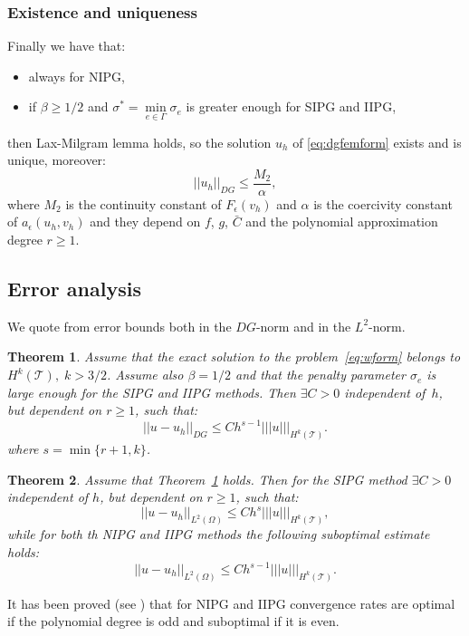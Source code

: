 \documentclass[12pt, a4paper]{article}
\theoremstyle{definition}
\theoremstyle{plain}
\theoremstyle{plain}
\newtheorem{teor}{Theorem}
\theoremstyle{definition}
\begin{document}
\subsubsection{Existence and uniqueness}
Finally we have that:
\begin{itemize}
	\item always for NIPG,
	\item if $\beta \geq 1/2$ and $\sigma^* = \min\limits_{e \in \Gamma} 
	\sigma_e$ is greater enough for SIPG and IIPG,
\end{itemize}
then Lax-Milgram lemma holds, so the solution $u_h$ of \eqref{eq:dgfemform} 
exists and is unique, moreover:\\
\begin{equation*}
	|\!|u_h|\!|_{DG} \leq \frac{M_2}{\alpha},
\end{equation*}
where $M_2$ is the continuity constant of $F_\epsilon(v_h)$ and $\alpha$ is the 
coercivity constant of $a_\epsilon(u_h,v_h)$ and they depend on $f$, $g$, 
$\bar{C}$ and the polynomial approximation degree $r \geq 1$.
\subsection{Error analysis}
We quote from \cite{riviere} error bounds both in the $DG$-norm and in the $L^2$-norm.
\begin{teor} \label{teo:errdg}
	Assume that the exact solution to the problem~\eqref{eq:wform} belongs to 
	$H^k(\mathcal{T}), \; k>3/2$. Assume also $\beta = 1/2$ and that the 
	penalty parameter $\sigma_e$ is large enough for the SIPG and IIPG methods. 
	Then $\exists C>0$ independent of~$h$, but dependent on $r \geq 1$, such 
	that:
	\begin{equation*}
		|\!| u -u_h |\!|_{DG} \leq C h^{s-1} |\!|\!|u|\!|\!|_{H^k(\mathcal{T})}.
	\end{equation*}
	where $s = \min \{r+1, k\}$.
\end{teor}
\begin{teor}
	Assume that Theorem~\ref{teo:errdg} holds. Then for the SIPG method 
	$\exists C>0$ independent of $h$, but dependent on $r \geq 1$, such that:
	\begin{equation*}
		|\!| u-u_h |\!|_{L^2(\Omega)} \leq C h^{s} |\!|\!|u|\!|\!|_{H^k(\mathcal{T})},
	\end{equation*}
	while for both th NIPG and IIPG methods the following suboptimal estimate holds:
	\begin{equation*}
				|\!| u-u_h |\!|_{L^2(\Omega)} \leq C h^{s-1} 
				|\!|\!|u|\!|\!|_{H^k(\mathcal{T})}.
	\end{equation*}
\end{teor}
It has been proved (see \cite{ayuso}) that for NIPG and IIPG convergence rates 
are 
optimal if the 
polynomial degree is odd and suboptimal if it is even.\\
\end{document}

